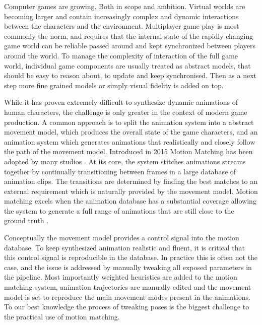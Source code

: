 Computer games are growing. Both in scope and ambition. Virtual worlds are becoming larger and contain increasingly complex and dynamic interactions between the characters and the environment. Multiplayer game play is most commonly the norm, and requires that the internal state of the rapidly changing game world can be reliable passed around and kept synchronized between players around the world. To manage the complexity of interaction of the full game world, individual game components are usually treated as abstract models, that should be easy to reason about, to update and keep synchronised. Then as a next step more fine grained models or simply visual fidelity is added on top. 

While it has proven extremely difficult to synthesize dynamic animations of human characters, the challenge is only greater in the context of modern game production. A common approach is to split the animation system into a abstract movement model, which produces the overall state of the game characters, and an animation system which generates animations that realistically and closely follow the path of the movement model. Introduced in 2015 Motion Matching has been adopted by many studios . At its core, the system stitches animations streams together by continually transitioning between frames in a large database of animation clips. The transitions are determined by finding the best matches to an external requirement which is naturally provided by the movement model. Motion matching excels when the animation database has a substantial coverage allowing the system to generate a full range of animations that are still close to the ground truth . 

Conceptually the movement model provides a control signal into the motion database. To keep synthesized animation realistic and fluent, it is critical that this control signal is reproducible in the database. In practice this is often not the case, and the issue is addressed by manually tweaking all exposed parameters in the pipeline. Most importantly weighted heuristics are added to the motion matching system, animation trajectories are manually edited and the movement model is set to reproduce the main movement modes present in the animations. To our best knowledge the process of tweaking poses is the biggest challenge to the practical use of motion matching.

